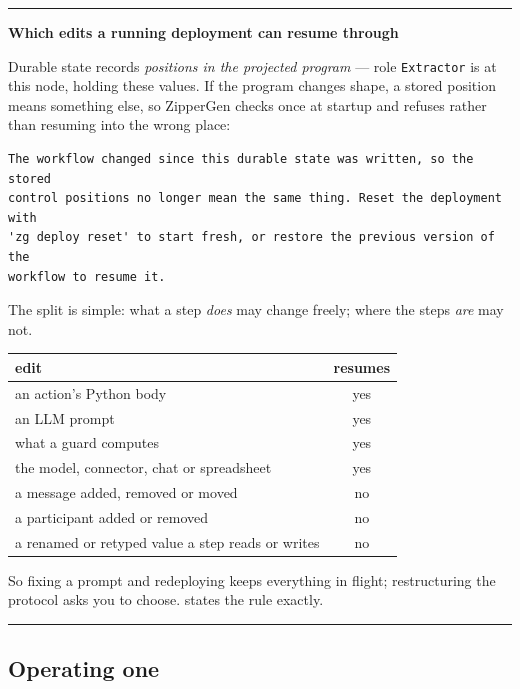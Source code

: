 \documentclass[11pt,a4paper]{article}
\newenvironment{notebox}[1]
{\begin{center}\begin{minipage}{0.94\linewidth}
 \color{ZipperInk}\hrule\vspace{5pt}\textbf{#1}\par\smallskip}
{\vspace{5pt}\hrule\end{minipage}\end{center}}
\begin{document}
\begin{notebox}{Which edits a running deployment can resume through}
Durable state records \emph{positions in the projected program} --- role
\texttt{Extractor} is at this node, holding these values. If the program
changes shape, a stored position means something else, so ZipperGen checks
once at startup and refuses rather than resuming into the wrong place:

\begin{lstlisting}[style=shell]
The workflow changed since this durable state was written, so the stored
control positions no longer mean the same thing. Reset the deployment with
'zg deploy reset' to start fresh, or restore the previous version of the
workflow to resume it.
\end{lstlisting}

The split is simple: what a step \emph{does} may change freely; where the
steps \emph{are} may not.

\begin{center}
\begin{tabularx}{0.95\linewidth}{@{}Xc@{}}
\toprule
edit & resumes \\
\midrule
an action's Python body & yes \\
an LLM prompt & yes \\
what a guard computes & yes \\
the model, connector, chat or spreadsheet & yes \\
a message added, removed or moved & no \\
a participant added or removed & no \\
a renamed or retyped value a step reads or writes & no \\
\bottomrule
\end{tabularx}
\end{center}

So fixing a prompt and redeploying keeps everything in flight; restructuring
the protocol asks you to choose.  states the
rule exactly.
\end{notebox}

\subsection{Operating one}
\end{document}
